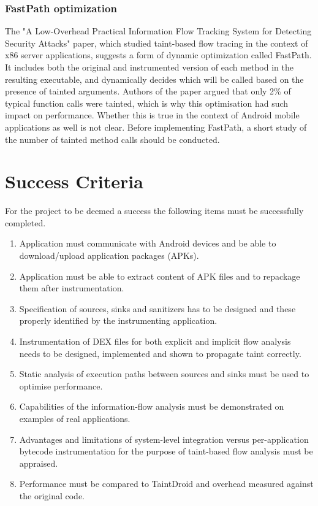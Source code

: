 \documentclass[12pt]{article}
\begin{document}
\subsubsection*{FastPath optimization}

The "A Low-Overhead Practical Information Flow Tracking System for 
Detecting Security Attacks" paper, which studied taint-based flow tracing 
in the context of x86 server applications, suggests a form of dynamic 
optimization called FastPath. It includes both the original and 
instrumented version of each method in the resulting executable, and
dynamically decides which will be called based on the presence of tainted 
arguments. Authors of the paper argued that only 2\% of typical 
function calls were tainted, which is why this optimisation had such  
impact on performance. Whether this is true in the context of Android mobile
applications as well is not clear. Before implementing FastPath, a short 
study of the number of tainted method calls should be conducted.

\section*{Success Criteria}

For the project to be deemed a success the following items must be
successfully completed.

\begin{enumerate}

\item Application must communicate with Android devices and be able to
      download/upload application packages (APKs).

\item Application must be able to extract content of APK files
      and to repackage them after instrumentation.

\item Specification of sources, sinks and sanitizers has to be designed
      and these properly identified by the instrumenting application.

\item Instrumentation of DEX files for both explicit and implicit flow 
      analysis needs to be designed, implemented and shown to propagate 
      taint correctly.

\item Static analysis of execution paths between sources and sinks 
      must be used to optimise performance.

\item Capabilities of the information-flow analysis must be demonstrated
      on examples of real applications.
      
\item Advantages and limitations of system-level integration versus 
      per-application bytecode instrumentation for the purpose of 
      taint-based flow analysis must be appraised.

\item Performance must be compared to TaintDroid and overhead measured
      against the original code.

\end{enumerate}
\end{document}
